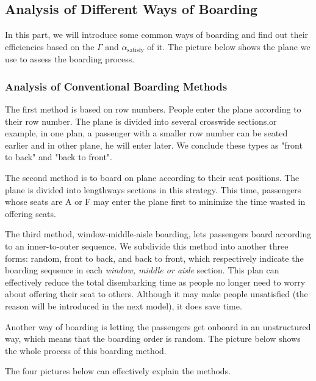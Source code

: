 \documentclass{article}
\theoremstyle{definition}
\theoremstyle{remark}
\numberwithin{equation}{section}
\begin{document}
	\subsection{Analysis of Different Ways of Boarding}
	In this part, we will introduce some common ways of boarding and find out their efficiencies based on the $\Gamma$ and $\alpha_\text{satisfy}$ of it. The picture below shows the plane we use to assess the boarding process.

	\subsubsection{Analysis of Conventional Boarding Methods}
	The first method is based on row numbers. People enter the plane according to their row number. The plane is divided into several crosswide sections.or example, in one plan, a passenger with a smaller row number can be seated earlier and in other plane, he will enter later. We conclude these types as "front to back" and "back to front".

	The second method is to board on plane according to their seat positions. The plane is divided into lengthways sections in this strategy. This time, passengers whose seats are A or F may enter the plane first to minimize the time wasted in offering seats.

	The third method, window-middle-aisle boarding, lets passengers board according to an inner-to-outer sequence. We subdivide this method into another three forms: random, front to back, and back to front, which respectively indicate the boarding sequence in each \textit{window, middle or aisle} section. This plan can effectively reduce the total disembarking time as people no longer need to worry about offering their seat to others. Although it may make people unsatisfied (the reason will be introduced in the next model), it does save time.

	Another way of boarding is letting the passengers get onboard in an unstructured way, which means that the boarding order is random. The picture below shows the whole process of this boarding method.

	The four pictures below can effectively explain the methods.
\end{document}

